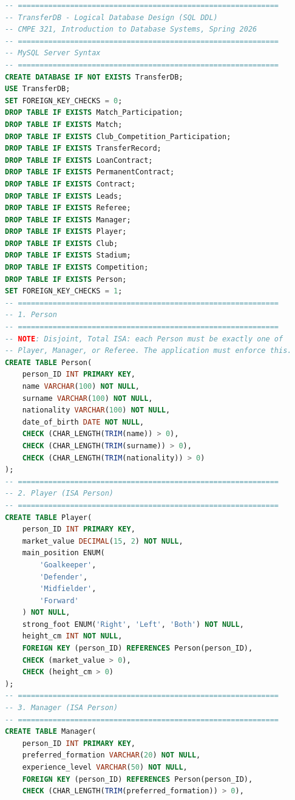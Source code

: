 \documentclass[12pt, a4paper]{article}
\begin{document}
\begin{lstlisting}[language=SQL, caption=Logical Schema DDL (part2.sql), label=lst:sql]
-- ============================================================
-- TransferDB - Logical Database Design (SQL DDL)
-- CMPE 321, Introduction to Database Systems, Spring 2026
-- ============================================================
-- MySQL Server Syntax
-- ============================================================
CREATE DATABASE IF NOT EXISTS TransferDB;
USE TransferDB;
SET FOREIGN_KEY_CHECKS = 0;
DROP TABLE IF EXISTS Match_Participation;
DROP TABLE IF EXISTS Match;
DROP TABLE IF EXISTS Club_Competition_Participation;
DROP TABLE IF EXISTS TransferRecord;
DROP TABLE IF EXISTS LoanContract;
DROP TABLE IF EXISTS PermanentContract;
DROP TABLE IF EXISTS Contract;
DROP TABLE IF EXISTS Leads;
DROP TABLE IF EXISTS Referee;
DROP TABLE IF EXISTS Manager;
DROP TABLE IF EXISTS Player;
DROP TABLE IF EXISTS Club;
DROP TABLE IF EXISTS Stadium;
DROP TABLE IF EXISTS Competition;
DROP TABLE IF EXISTS Person;
SET FOREIGN_KEY_CHECKS = 1;
-- ============================================================
-- 1. Person
-- ============================================================
-- NOTE: Disjoint, Total ISA: each Person must be exactly one of
-- Player, Manager, or Referee. The application must enforce this.
CREATE TABLE Person(
    person_ID INT PRIMARY KEY,
    name VARCHAR(100) NOT NULL,
    surname VARCHAR(100) NOT NULL,
    nationality VARCHAR(100) NOT NULL,
    date_of_birth DATE NOT NULL,
    CHECK (CHAR_LENGTH(TRIM(name)) > 0),
    CHECK (CHAR_LENGTH(TRIM(surname)) > 0),
    CHECK (CHAR_LENGTH(TRIM(nationality)) > 0)
);
-- ============================================================
-- 2. Player (ISA Person)
-- ============================================================
CREATE TABLE Player(
    person_ID INT PRIMARY KEY,
    market_value DECIMAL(15, 2) NOT NULL,
    main_position ENUM(
        'Goalkeeper',
        'Defender',
        'Midfielder',
        'Forward'
    ) NOT NULL,
    strong_foot ENUM('Right', 'Left', 'Both') NOT NULL,
    height_cm INT NOT NULL,
    FOREIGN KEY (person_ID) REFERENCES Person(person_ID),
    CHECK (market_value > 0),
    CHECK (height_cm > 0)
);
-- ============================================================
-- 3. Manager (ISA Person)
-- ============================================================
CREATE TABLE Manager(
    person_ID INT PRIMARY KEY,
    preferred_formation VARCHAR(20) NOT NULL,
    experience_level VARCHAR(50) NOT NULL,
    FOREIGN KEY (person_ID) REFERENCES Person(person_ID),
    CHECK (CHAR_LENGTH(TRIM(preferred_formation)) > 0),

\end{lstlisting}
\end{document}
